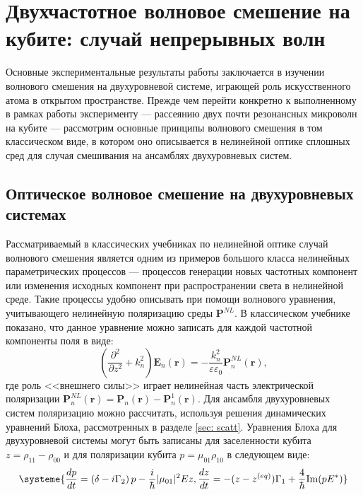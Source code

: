\chapter{Двухчастотное волновое смешение на кубите: случай непрерывных волн}
Основные экспериментальные результаты работы заключается в изучении волнового смешения на двухуровневой системе, играющей роль искусственного атома в открытом пространстве. Прежде чем перейти конкретно к выполненному в рамках работы эксперименту --- рассеянию двух почти резонансных микроволн на кубите --- рассмотрим основные принципы волнового смешения в том классическом виде, в котором оно описывается в нелинейной оптике сплошных сред для случая смешивания на ансамблях двухуровневых систем.
\section{Оптическое волновое смешение на двухуровневых системах}
Рассматриваемый в классических учебниках по нелинейной оптике случай волнового смешения является одним из примеров большого класса нелинейных параметрических процессов --- процессов генерации новых частотных компонент или изменения исходных компонент при распространении света в нелинейной среде. Такие процессы удобно описывать при помощи волнового уравнения, учитывающего нелинейную поляризацию среды $\mathbf{P}^{N\!L}$. В классическом учебнике \cite{boyd2003nonlinear} показано, что данное уравнение можно записать для каждой частотной компоненты поля в виде:
\begin{equation}
\left( \frac{\partial^2}{\partial z^2} + k_n^2\right) \mathbf{E}_n(\mathbf{r}) = -\frac{k_n^2}{\varepsilon\varepsilon_0}\mathbf{P}^{N\!L}_n(\mathbf{r}),
\label{eq: P_NL}
\end{equation}
где роль <<внешнего силы>> играет нелинейная часть электрической поляризации $\mathbf{P}^{N\!L}_n(\mathbf{r}) = \mathbf{P}_n(\mathbf{r}) - \mathbf{P}^{1}_n(\mathbf{r})$. Для ансамбля двухуровневых систем поляризацию можно рассчитать, используя решения динамических уравнений Блоха, рассмотренных в разделе \ref{sec: scatt}. Уравнения Блоха для двухуровневой системы могут быть записаны для заселенности кубита $z = \rho_{11}-\rho_{00}$ и для поляризации кубита $p=\mu_{01}\rho_{10}$ в следующем виде:
\begin{equation}
\systeme{\frac{dp}{dt} = \left(\delta-i\Gamma_2\right)p -\frac{i}{\hbar}|\mu_{01}|^2Ez,
	\frac{dz}{dt} = -(z-z^{(eq)})\Gamma_1 + \frac{4}{\hbar}\text{Im}(pE^*)}
\label{eq: bloch_p_z}
\end{equation}
